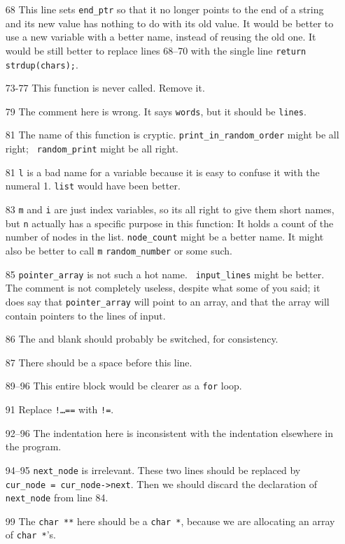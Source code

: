 \begin{itemize}
{\tt if}. 
\item[68] This line sets {\tt end\_ptr} so that it no longer points to
the end of a string and its new value has nothing to do with its old
value.  It would be better to use a new variable with a better name,
instead of reusing the old one.  It would be still better to replace
lines 68--70 with the single line {\tt return strdup(chars);}.  
\item[73-77] This function is never called.  Remove it.
\item[79] The comment here is wrong.  It says {\tt words}, but it should
be {\tt lines}.
\item[81] The name of this function is
cryptic.  {\tt print\_in\_random\_order} might be all right; {\tt
random\_print} might be all right.
\item[81] {\tt l} is a bad name for a variable because it is easy to
confuse it with the numeral 1.  {\tt list} would have been better.
\item[83]  {\tt m} and {\tt i} are just index variables, so its all
right to give them short names, but {\tt n} actually has a specific
purpose in this function:  It holds a count of the number of nodes in
the list.  {\tt node\_count} might be a better name.  It might also be
better to call {\tt m} {\tt random\_number} or some such.
\item[85] {\tt pointer\_array} is not such a hot name.  {\tt
input\_lines} might be better.  The comment is not completely useless,
despite what some of you said; it does say that {\tt pointer\_array}
will point to an array, and that the array will contain pointers to the
lines of input.  
\item[86] The {\tt *} and blank should probably be switched, for
consistency.
\item[87] There should be a space before this line.
\item[89--96] This entire block would be clearer as a {\tt for} loop.
\item[91] Replace {\tt !{\rm\ldots}==} with {\tt !=}.
\item[92--96] The indentation here is inconsistent with the indentation
elsewhere in the program.
\item[94--95] {\tt next\_node} is irrelevant.  These two lines should be
replaced by {\tt cur\_node = cur\_node->next}.  Then we should discard
the declaration of {\tt next\_node} from line 84.
\item[99] The {\tt char **} here should be a {\tt char *}, because we
are allocating an array of {\tt char *}'s.  

\end{itemize}
